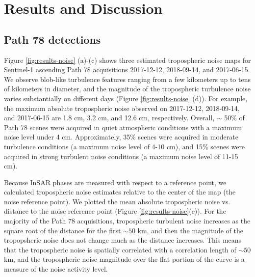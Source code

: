 \section{Results and Discussion}
\subsection{Path 78 detections}
\label{sec:results:path78}
Figure \ref{fig:results-noise} (a)-(c) shows three estimated tropospheric noise maps for Sentinel-1 ascending Path 78 acquisitions 2017-12-12, 2018-09-14, and 2017-06-15. We observe blob-like turbulence features ranging from a few kilometers up to tens of kilometers in diameter, and the magnitude of the tropospheric turbulence noise varies substantially on different days (Figure \ref{fig:results-noise} (d)). For example, the maximum absolute tropospheric noise observed on 2017-12-12, 2018-09-14, and 2017-06-15 are 1.8 cm, 3.2 cm, and 12.6 cm, respectively. Overall, $\sim$ 50\% of Path 78 scenes were acquired in quiet atmospheric conditions with a maximum noise level under 4 cm. Approximately, 35\% scenes were acquired in moderate turbulence conditions (a maximum noise level of 4-10 cm), and 15\% scenes were acquired in strong turbulent noise conditions (a maximum noise level of 11-15 cm). 

Because InSAR phases are measured with respect to a reference point, we calculated tropospheric noise estimates relative to the center of the map (the noise reference point). We plotted the mean absolute tropospheric noise vs. distance to the noise reference point (Figure \ref{fig:results-noise}(e)). For the majority of the Path 78 acquisitions, tropospheric turbulent noise increases as the square root of the distance for the first $\sim 50$ km, and then the magnitude of the tropopsheric noise does not change much as the distance increases. This means that the tropospheric noise is spatially correlated with a correlation length of $\sim 50$ km, and the tropospheric noise magnitude over the flat portion of the curve is a measure of the noise activity level. 



